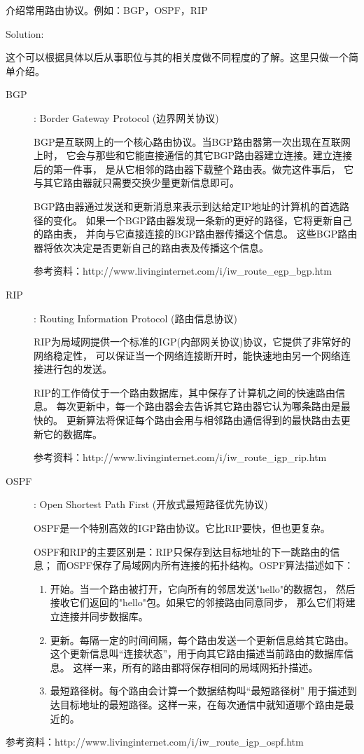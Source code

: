 \begin{description}
  介绍常用路由协议。例如：BGP，OSPF，RIP

  Solution:

  这个可以根据具体以后从事职位与其的相关度做不同程度的了解。这里只做一个简单介绍。
  \begin{description}
  \item[BGP]: Border Gateway Protocol (边界网关协议)

    BGP是互联网上的一个核心路由协议。当BGP路由器第一次出现在互联网上时， 它会与那些和它能直接通信的其它BGP路由器建立连接。建立连接后的第一件事， 是从它相邻的路由器下载整个路由表。做完这件事后， 它与其它路由器就只需要交换少量更新信息即可。

    BGP路由器通过发送和更新消息来表示到达给定IP地址的计算机的首选路径的变化。 如果一个BGP路由器发现一条新的更好的路径，它将更新自己的路由表， 并向与它直接连接的BGP路由器传播这个信息。 这些BGP路由器将依次决定是否更新自己的路由表及传播这个信息。

    参考资料：http://www.livinginternet.com/i/iw\_route\_egp\_bgp.htm

  \item[RIP]: Routing Information Protocol (路由信息协议)

    RIP为局域网提供一个标准的IGP(内部网关协议)协议，它提供了非常好的网络稳定性， 可以保证当一个网络连接断开时，能快速地由另一个网络连接进行包的发送。

    RIP的工作倚仗于一个路由数据库，其中保存了计算机之间的快速路由信息。 每次更新中，每一个路由器会去告诉其它路由器它认为哪条路由是最快的。 更新算法将保证每个路由会用与相邻路由通信得到的最快路由去更新它的数据库。

    参考资料：http://www.livinginternet.com/i/iw\_route\_igp\_rip.htm

  \item[OSPF]: Open Shortest Path First (开放式最短路径优先协议)

    OSPF是一个特别高效的IGP路由协议。它比RIP要快，但也更复杂。

    OSPF和RIP的主要区别是：RIP只保存到达目标地址的下一跳路由的信息； 而OSPF保存了局域网内所有连接的拓扑结构。OSPF算法描述如下：
    \begin{enumerate}
    \item 开始。当一个路由被打开，它向所有的邻居发送"hello"的数据包， 然后接收它们返回的"hello"包。如果它的邻接路由同意同步， 那么它们将建立连接并同步数据库。
    \item 更新。每隔一定的时间间隔，每个路由发送一个更新信息给其它路由。 这个更新信息叫“连接状态”，用于向其它路由描述当前路由的数据库信息。 这样一来，所有的路由都将保存相同的局域网拓扑描述。
    \item 最短路径树。每个路由会计算一个数据结构叫“最短路径树” 用于描述到达目标地址的最短路径。这样一来，在每次通信中就知道哪个路由是最近的。
    \end{enumerate}
  \end{description}
  参考资料：http://www.livinginternet.com/i/iw\_route\_igp\_ospf.htm



\end{description}

